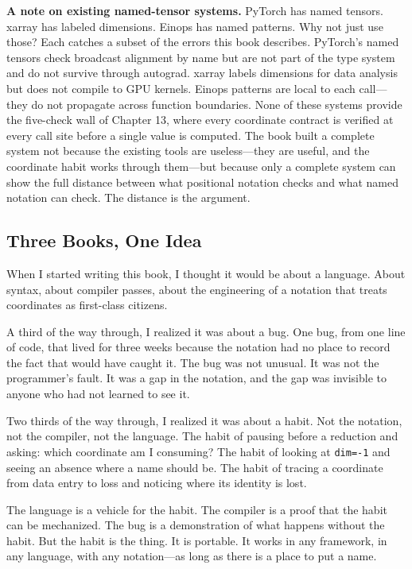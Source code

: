 \documentclass[11pt,titlepage]{article}
\begin{document}
\textbf{A note on existing named-tensor systems.} PyTorch has named
tensors. xarray has labeled dimensions. Einops has named patterns. Why
not just use those? Each catches a subset of the errors this book
describes. PyTorch's named tensors check broadcast alignment by name but
are not part of the type system and do not survive through autograd.
xarray labels dimensions for data analysis but does not compile to GPU
kernels. Einops patterns are local to each call---they do not propagate
across function boundaries. None of these systems provide the five-check
wall of Chapter 13, where every coordinate contract is verified at every
call site before a single value is computed. The book built a complete
system not because the existing tools are useless---they are useful, and
the coordinate habit works through them---but because only a complete
system can show the full distance between what positional notation
checks and what named notation can check. The distance is the argument.

\vspace{2em}

\hypertarget{three-books-one-idea}{%
\subsection{Three Books, One Idea}\label{three-books-one-idea}}

When I started writing this book, I thought it would be about a
language. About syntax, about compiler passes, about the engineering of
a notation that treats coordinates as first-class citizens.

A third of the way through, I realized it was about a bug. One bug, from
one line of code, that lived for three weeks because the notation had no
place to record the fact that would have caught it. The bug was not
unusual. It was not the programmer's fault. It was a gap in the
notation, and the gap was invisible to anyone who had not learned to see
it.

Two thirds of the way through, I realized it was about a habit. Not the
notation, not the compiler, not the language. The habit of pausing
before a reduction and asking: which coordinate am I consuming? The
habit of looking at \texttt{dim=-1} and seeing an absence where a name
should be. The habit of tracing a coordinate from data entry to loss and
noticing where its identity is lost.

The language is a vehicle for the habit. The compiler is a proof that
the habit can be mechanized. The bug is a demonstration of what happens
without the habit. But the habit is the thing. It is portable. It works
in any framework, in any language, with any notation---as long as there
is a place to put a name.
\end{document}
